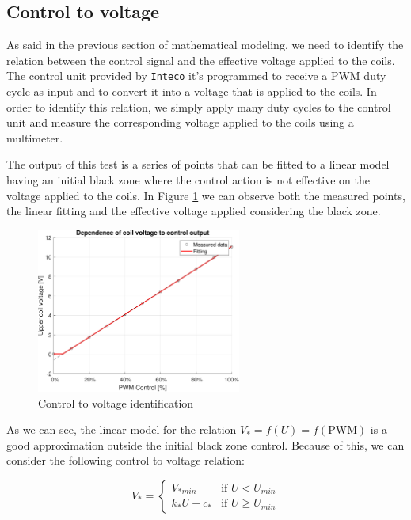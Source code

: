 \subsection{Control to voltage}
\label{subsec:control_to_voltage}

As said in the previous section of mathematical modeling, we need to identify the relation between the control signal and the effective voltage applied to the coils.
The control unit provided by \texttt{Inteco} it's programmed to receive a PWM duty cycle as input and to convert it into a voltage that is applied to the coils.
In order to identify this relation, we simply apply many duty cycles to the control unit and measure the corresponding voltage applied to the coils using a multimeter.

The output of this test is a series of points that can be fitted to a linear model having an initial black zone where the control action is not effective on the voltage applied to the coils.
In Figure \ref{fig:control_to_voltage} we can observe both the measured points, the linear fitting and the effective voltage applied considering the black zone.

\begin{figure}[H]
    \centering
    \includegraphics[width=0.6\textwidth]{img/MATLAB/identification/control_to_voltage.pdf}
    \caption{Control to voltage identification}
    \label{fig:control_to_voltage}
\end{figure}

As we can see, the linear model for the relation $V_* = f(U) = f(\text{PWM})$ is a good approximation outside the initial black zone control.
Because of this, we can consider the following control to voltage relation:

\begin{equation}
    V_* = \begin{cases}
        V_{*min}    & \text{if } U < U_{min}    \\
        k_* U + c_* & \text{if } U \geq U_{min}
    \end{cases}
\end{equation}

